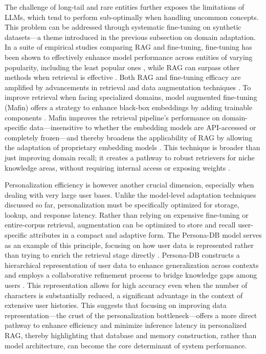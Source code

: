 \documentclass[11pt]{article}
\begin{document}
The challenge of long-tail and rare entities further exposes the limitations of LLMs, which tend to perform sub-optimally when handling uncommon concepts. This problem can be addressed through systematic fine-tuning on synthetic datasets---a theme introduced in the previous subsection on domain adaptation. In a suite of empirical studies comparing RAG and fine-tuning, fine-tuning has been shown to effectively enhance model performance across entities of varying popularity, including the least popular ones \cite{ref77}, while RAG can surpass other methods when retrieval is effective \cite{ref77}. Both RAG and fine-tuning efficacy are amplified by advancements in retrieval and data augmentation techniques \cite{ref77}. To improve retrieval when facing specialized domains, model augmented fine-tuning (Mafin) offers a strategy to enhance black-box embeddings by adding trainable components \cite{ref54}. Mafin improves the retrieval pipeline's performance on domain-specific data---insensitive to whether the embedding models are API-accessed or completely frozen---and thereby broadens the applicability of RAG by allowing the adaptation of proprietary embedding models \cite{ref54}. This technique is broader than just improving domain recall; it creates a pathway to robust retrievers for niche knowledge areas, without requiring internal access or exposing weights \cite{ref54}.

Personalization efficiency is however another crucial dimension, especially when dealing with very large user bases. Unlike the model-level adaptation techniques discussed so far, personalization must be specifically optimized for storage, lookup, and response latency. Rather than relying on expensive fine-tuning or entire-corpus retrieval, augmentation can be optimized to store and recall user-specific attributes in a compact and adaptive form. The Persona-DB model serves as an example of this principle, focusing on how user data is represented rather than trying to enrich the retrieval stage directly \cite{ref220}. Persona-DB constructs a hierarchical representation of user data to enhance generalization across contexts and employs a collaborative refinement process to bridge knowledge gaps among users \cite{ref220}. This representation allows for high accuracy even when the number of characters is substantially reduced, a significant advantage in the context of extensive user histories. This suggests that focusing on improving data representation---the crust of the personalization bottleneck---offers a more direct pathway to enhance efficiency and minimize inference latency in personalized RAG, thereby highlighting that database and memory construction, rather than model architecture, can become the core determinant of system performance.
\end{document}
